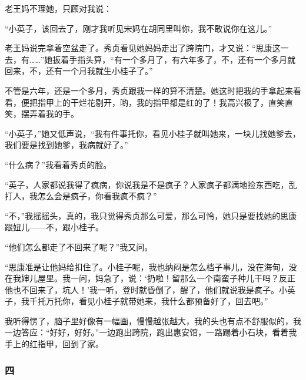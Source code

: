 \par 老王妈不理她，只顾对我说：
\par “小英子，该回去了，刚才我听见宋妈在胡同里叫你，我不敢说你在这儿。”
\par 老王妈说完拿着空盆走了。秀贞看见她妈妈走出了跨院门，才又说：“思康这一去，有……”她扳着手指头算，“有一个多月了，有六年多了，不，还有一个多月就回来，不，还有一个月我就生小桂子了。”
\par 不管是六年，还是一个多月，秀贞跟我一样的算不清楚。她这时把我的手拿起来看看，便把指甲上的干烂花剔开，哟，我的指甲都是红的了！我高兴极了，直笑直笑，摆弄着我的手。
\par “小英子，”她又低声说，“我有件事托你，看见小桂子就叫她来，一块儿找她爹去，我们要是找到她爹，我病就好了。”
\par “什么病？”我看着秀贞的脸。
\par “英子，人家都说我得了疯病，你说我是不是疯子？人家疯子都满地捡东西吃，乱打人，我怎么会是疯子，你看我疯不疯？”
\par “不，”我摇摇头，真的，我只觉得秀贞那么可爱，那么可怜，她只是要找她的思康跟妞儿——不，跟小桂子。
\par “他们怎么都走了不回来了呢？”我又问。
\par “思康准是让他妈给扣住了。小桂子呢，我也纳闷是怎么档子事儿，没在海甸，没在我婶儿屋里。我一问，妈急了，说：‘扔啦！留那么一个南蛮子种儿干吗？反正他也不回来了，坑人！’我一听，登时就昏倒了，醒了，他们就说我是疯子。小英子，我千托万托你，看见小桂子就带她来，我什么都预备好了，回去吧。”
\par 我听得愣了，脑子里好像有一幅画，慢慢越张越大，我的头也有点不舒服似的，我一边答应：“好好，好好。”一边跑出跨院，跑出惠安馆，一路踢着小石块，看着我手上的红指甲，回到了家。

\subsubsection*{四}

